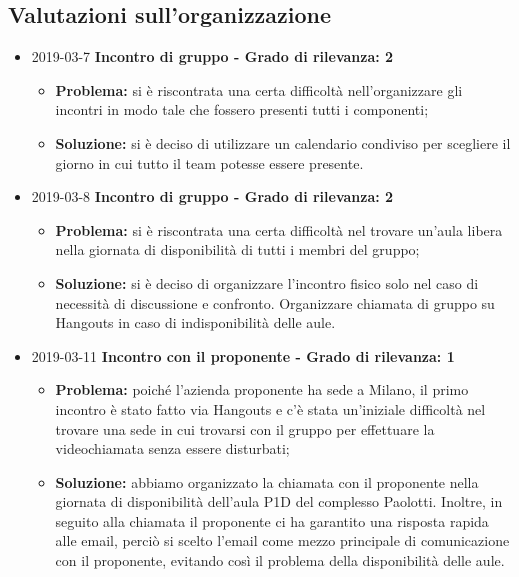 \subsection{Valutazioni sull'organizzazione}
\begin{itemize}	
		
		\item 2019-03-7 \textbf{Incontro di gruppo - Grado di rilevanza: 2} \\
		\begin{itemize}
			\item \textbf{Problema:} si è riscontrata una certa difficoltà 				nell'organizzare gli incontri in modo
		tale che fossero presenti tutti i componenti;
			\item \textbf{Soluzione:} si è deciso di utilizzare un calendario condiviso per scegliere il giorno
		in cui tutto il team potesse essere presente. 
		\end{itemize}
		
		\item 2019-03-8 \textbf{Incontro di gruppo - Grado di rilevanza: 2} \\
		\begin{itemize}
			\item \textbf{Problema:} si è riscontrata una certa difficoltà nel trovare un'aula libera nella giornata di disponibilità di tutti i membri del gruppo;
			\item \textbf{Soluzione:} si è deciso di organizzare l'incontro fisico solo nel caso di necessità di discussione e confronto. Organizzare chiamata di gruppo su Hangouts in caso di indisponibilità delle aule. 
		\end{itemize}
						
						
		\item 2019-03-11 \textbf{Incontro con il proponente - Grado di rilevanza: 1} \\
		\begin{itemize}
			\item \textbf{Problema:} poiché l'azienda proponente ha sede a Milano, il primo incontro è stato fatto
		via Hangouts e c'è stata un'iniziale difficoltà nel trovare una sede in cui 
		trovarsi con il gruppo per effettuare la videochiamata senza essere disturbati;
			\item \textbf{Soluzione:} abbiamo organizzato la chiamata con il proponente nella giornata di disponibilità dell'aula P1D del complesso Paolotti. Inoltre, in seguito alla chiamata il proponente ci ha garantito una risposta rapida alle email, perciò si scelto l'email come mezzo principale di comunicazione con il proponente, evitando così il problema della disponibilità delle aule.
		\end{itemize}
		

\end{itemize}
